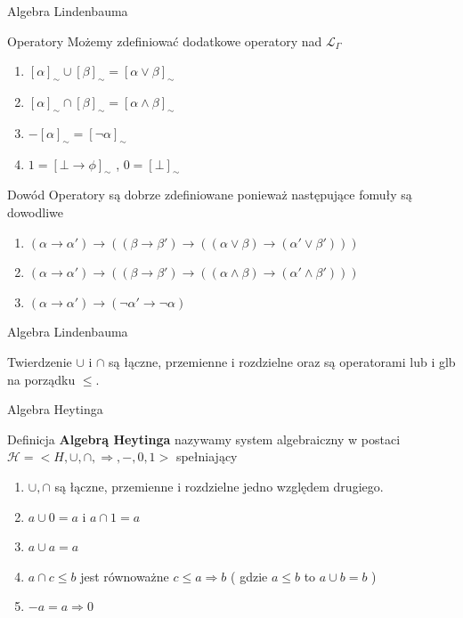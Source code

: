 \documentclass{beamer}
\begin{document}
\begin{frame}{Algebra Lindenbauma }
 \begin{block}{Operatory}
 Możemy zdefiniować dodatkowe operatory nad \( \mathcal{L}_{\Gamma} \)
 \begin{enumerate}
 \item \([\alpha]_{\sim} \cup [\beta]_{\sim} = [ \alpha \vee \beta ]_{\sim}\)
 \item \([\alpha]_{\sim} \cap [\beta]_{\sim} = [ \alpha \wedge \beta ]_{\sim}\)
  \item \(-[\alpha]_{\sim} = [\neg \alpha ]_{\sim}\)
  \item \( 1 = [\bot \rightarrow \phi ]_{\sim} \) , \( 0 = [\bot]_{\sim} \)
 \end{enumerate}
 \end{block}
 
  \begin{block}{Dowód}
 Operatory są dobrze zdefiniowane ponieważ następujące fomuły są dowodliwe
 \begin{enumerate}
 \item \((\alpha \rightarrow \alpha') \rightarrow 
 (
 	(\beta \rightarrow \beta') \rightarrow
 	(( \alpha \vee \beta) \rightarrow (\alpha' \vee \beta')))\)
  \item \((\alpha \rightarrow \alpha') \rightarrow 
 (
 	(\beta \rightarrow \beta') \rightarrow
 	(( \alpha \wedge \beta) \rightarrow (\alpha' \wedge \beta')))\)
  \item \((\alpha \rightarrow \alpha') \rightarrow 
(\neg \alpha' \rightarrow \neg \alpha)\)
 \end{enumerate}
 \end{block}
 
\end{frame}

\begin{frame}{Algebra Lindenbauma }
 \begin{block}{Twierdzenie}
 \( \cup \) i \(\cap \) są łączne, przemienne i rozdzielne oraz są operatorami lub i glb na porządku \( \leq \).
 \end{block}
 
\end{frame}

\begin{frame}{Algebra Heytinga}
 \begin{block}{Definicja}
\textbf{Algebrą Heytinga} nazywamy system algebraiczny w postaci \( \mathcal{H} = < H, \cup, \cap, \Rightarrow, - , 0 ,1 > \) spełniający 
\begin{enumerate}
	\item \(\cup, \cap\) są łączne, przemienne i rozdzielne jedno względem drugiego.
 \item \( a \cup 0 = a \) i \( a \cap 1 = a \) 
 \item \( a \cup a  = a \) 
 \item \( a \cap c \leq b \) jest równoważne \( c \leq a \Rightarrow b \) ( gdzie \( a \leq b \) to \( a \cup b  = b\) )
 \item \( -a  = a \Rightarrow 0 \)
\end{enumerate}
 \end{block}
\end{frame}
 
\end{document}
